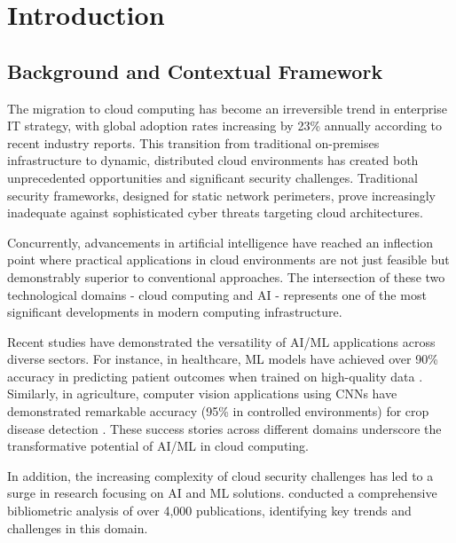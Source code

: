 \documentclass[a4paper,12pt]{article}
\begin{document}
\newpage

\section{Introduction}
\subsection{Background and Contextual Framework}
The migration to cloud computing has become an irreversible trend in enterprise IT strategy, with global adoption rates increasing by 23\% annually according to recent industry reports. This transition from traditional on-premises infrastructure to dynamic, distributed cloud environments has created both unprecedented opportunities and significant security challenges. Traditional security frameworks, designed for static network perimeters, prove increasingly inadequate against sophisticated cyber threats targeting cloud architectures.

Concurrently, advancements in artificial intelligence have reached an inflection point where practical applications in cloud environments are not just feasible but demonstrably superior to conventional approaches. The intersection of these two technological domains - cloud computing and AI - represents one of the most significant developments in modern computing infrastructure.

Recent studies have demonstrated the versatility of AI/ML applications across diverse sectors. For instance, in healthcare, ML models have achieved over 90\% accuracy in predicting patient outcomes when trained on high-quality data \citep{chen2017disease}. Similarly, in agriculture, computer vision applications using CNNs have demonstrated remarkable accuracy (95\% in controlled environments) for crop disease detection \citep{kamilaris2018deep}. These success stories across different domains underscore the transformative potential of AI/ML in cloud computing.

In addition, the increasing complexity of cloud security challenges has led to a surge in research focusing on AI and ML solutions. \citet{alzoubi2024research} conducted a comprehensive bibliometric analysis of over 4,000 publications, identifying key trends and challenges in this domain.
\end{document}
